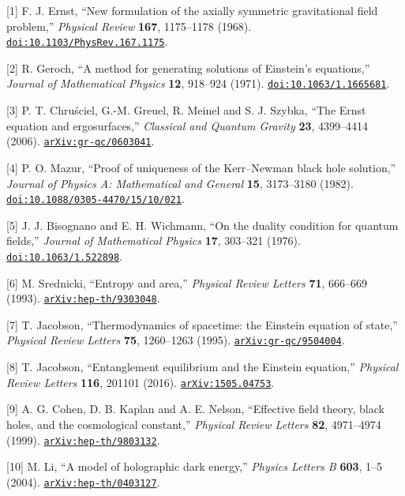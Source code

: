 \documentclass[
  11pt,
  a4paper,
]{article}
\begin{document}
{[}1{]} F. J. Ernst, ``New formulation of the axially symmetric gravitational field problem,'' \emph{Physical Review} \textbf{167}, 1175--1178 (1968). \href{https://doi.org/10.1103/PhysRev.167.1175}{\nolinkurl{doi:10.1103/PhysRev.167.1175}}.

{[}2{]} R. Geroch, ``A method for generating solutions of Einstein's equations,'' \emph{Journal of Mathematical Physics} \textbf{12}, 918--924 (1971). \href{https://doi.org/10.1063/1.1665681}{\nolinkurl{doi:10.1063/1.1665681}}.

{[}3{]} P. T. Chruściel, G.-M. Greuel, R. Meinel and S. J. Szybka, ``The Ernst equation and ergosurfaces,'' \emph{Classical and Quantum Gravity} \textbf{23}, 4399--4414 (2006). \href{https://arxiv.org/abs/gr-qc/0603041}{\nolinkurl{arXiv:gr-qc/0603041}}.

{[}4{]} P. O. Mazur, ``Proof of uniqueness of the Kerr--Newman black hole solution,'' \emph{Journal of Physics A: Mathematical and General} \textbf{15}, 3173--3180 (1982). \href{https://doi.org/10.1088/0305-4470/15/10/021}{\nolinkurl{doi:10.1088/0305-4470/15/10/021}}.

{[}5{]} J. J. Bisognano and E. H. Wichmann, ``On the duality condition for quantum fields,'' \emph{Journal of Mathematical Physics} \textbf{17}, 303--321 (1976). \href{https://doi.org/10.1063/1.522898}{\nolinkurl{doi:10.1063/1.522898}}.

{[}6{]} M. Srednicki, ``Entropy and area,'' \emph{Physical Review Letters} \textbf{71}, 666--669 (1993). \href{https://arxiv.org/abs/hep-th/9303048}{\nolinkurl{arXiv:hep-th/9303048}}.

{[}7{]} T. Jacobson, ``Thermodynamics of spacetime: the Einstein equation of state,'' \emph{Physical Review Letters} \textbf{75}, 1260--1263 (1995). \href{https://arxiv.org/abs/gr-qc/9504004}{\nolinkurl{arXiv:gr-qc/9504004}}.

{[}8{]} T. Jacobson, ``Entanglement equilibrium and the Einstein equation,'' \emph{Physical Review Letters} \textbf{116}, 201101 (2016). \href{https://arxiv.org/abs/1505.04753}{\nolinkurl{arXiv:1505.04753}}.

{[}9{]} A. G. Cohen, D. B. Kaplan and A. E. Nelson, ``Effective field theory, black holes, and the cosmological constant,'' \emph{Physical Review Letters} \textbf{82}, 4971--4974 (1999). \href{https://arxiv.org/abs/hep-th/9803132}{\nolinkurl{arXiv:hep-th/9803132}}.

{[}10{]} M. Li, ``A model of holographic dark energy,'' \emph{Physics Letters B} \textbf{603}, 1--5 (2004). \href{https://arxiv.org/abs/hep-th/0403127}{\nolinkurl{arXiv:hep-th/0403127}}.
\end{document}
